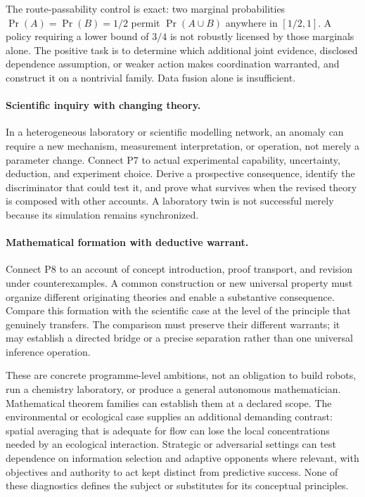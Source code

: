 \documentclass[11pt]{article}
\theoremstyle{definition}
\begin{document}
The route-passability control is exact: two marginal probabilities $\Pr(A)=\Pr(B)=1/2$ permit $\Pr(A\cup B)$ anywhere in $[1/2,1]$. A policy requiring a lower bound of $3/4$ is not robustly licensed by those marginals alone. The positive task is to determine which additional joint evidence, disclosed dependence assumption, or weaker action makes coordination warranted, and construct it on a nontrivial family. Data fusion alone is insufficient.

\paragraph{Scientific inquiry with changing theory.}
In a heterogeneous laboratory or scientific modelling network, an anomaly can require a new mechanism, measurement interpretation, or operation, not merely a parameter change. Connect P7 to actual experimental capability, uncertainty, deduction, and experiment choice. Derive a prospective consequence, identify the discriminator that could test it, and prove what survives when the revised theory is composed with other accounts. A laboratory twin is not successful merely because its simulation remains synchronized.

\paragraph{Mathematical formation with deductive warrant.}
Connect P8 to an account of concept introduction, proof transport, and revision under counterexamples. A common construction or new universal property must organize different originating theories and enable a substantive consequence. Compare this formation with the scientific case at the level of the principle that genuinely transfers. The comparison must preserve their different warrants; it may establish a directed bridge or a precise separation rather than one universal inference operation.

These are concrete programme-level ambitions, not an obligation to build robots, run a chemistry laboratory, or produce a general autonomous mathematician. Mathematical theorem families can establish them at a declared scope. The environmental or ecological case supplies an additional demanding contrast: spatial averaging that is adequate for flow can lose the local concentrations needed by an ecological interaction. Strategic or adversarial settings can test dependence on information selection and adaptive opponents where relevant, with objectives and authority to act kept distinct from predictive success. None of these diagnostics defines the subject or substitutes for its conceptual principles.
\end{document}
